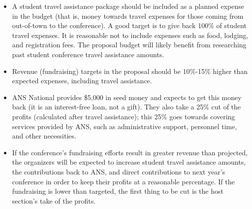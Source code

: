 \documentclass[12pt]{article}
\begin{document}
\begin{itemize}
\item{A student travel assistance package should be included as a planned expense in the budget (that is, money towards travel expenses for those coming from out-of-town to the conference). A good target is to give back 100\% of student travel expenses. It is reasonable not to include expenses such as food, lodging, and registration fees.} The proposal budget will likely benefit from researching past student conference travel assistance amounts.
\item{Revenue (fundraising) targets in the proposal should be 10\%-15\% higher than expected expenses, including travel assistance.}
\item{ANS National provides \$5,000 in seed money and expects to get this money back (it is an interest-free loan, not a gift)}. They also take a 25\% cut of the profits (calculated after travel assistance); this 25\% goes towards covering services provided by ANS, such as administrative support, personnel time, and other necessities.
\item{If the conference's fundraising efforts result in greater revenue than projected, the organizers will be expected to increase student travel assistance amounts, the contributions back to ANS, and direct contributions to next year’s conference in order to keep their profits at a reasonable percentage. If the fundraising is lower than targeted, the first thing to be cut is the host section’s take of the profits.}
\end{itemize}
\end{document}
